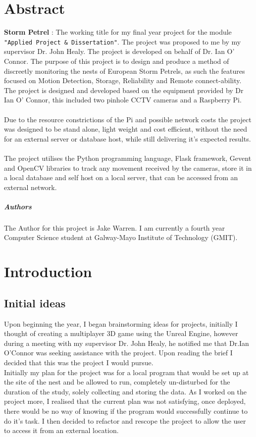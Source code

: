 

\chapter*{Abstract}

\textbf{Storm Petrel} : The working title for my final year project for the module  \verb|"Applied Project & Dissertation"|. The project was proposed to me by my supervisor Dr. John Healy. The project is developed on behalf of Dr. Ian O' Connor. The purpose of this project is to design and produce a method of discreetly monitoring the nests of European Storm Petrels, as such the features focused on Motion Detection, Storage, Reliability and Remote connect-ability. The project is designed and developed based on the equipment provided by Dr Ian O' Connor, this included two pinhole CCTV cameras and a Raspberry Pi. \\\\Due to the resource constrictions of the Pi and possible network costs the project was designed to be stand alone, light weight and cost efficient, without the need for an external server or database host, while still delivering it's expected results.\\\\ The project utilises the Python programming language, Flask framework, Gevent and OpenCV libraries to track any movement received by the cameras, store it in a local database and self host on a local server, that can be accessed from an external network. 

\paragraph{Authors}
The Author for this project is Jake Warren. I am currently a fourth year Computer Science student at Galway-Mayo Institute of Technology (GMIT). 


\chapter{Introduction}
\section {Initial ideas}
Upon beginning the year, I began brainstorming ideas for projects, initially I thought of creating a multiplayer 3D game using the Unreal Engine, however during a meeting with my supervisor Dr. John Healy, he notified me that Dr.Ian O'Connor was seeking assistance with the project. Upon reading the brief I decided that this was the project I would pursue. \\ Initially my plan for the project was for a local program that would be set up at the site of the nest and be allowed to run, completely un-disturbed for the duration of the study, solely collecting and storing the data. As I worked on the project more, I realised that the current plan was not satisfying, once deployed, there would be no way of knowing if the program would successfully continue to do it's task. I then decided to refactor and rescope the project to allow the user to access it from an external location.
